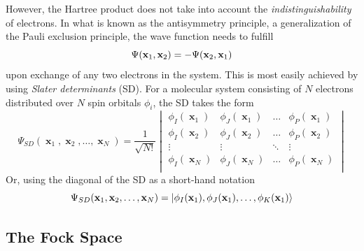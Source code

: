 However, the Hartree product does not take into account the \emph{indistinguishability} of electrons. In what is known as the antisymmetry principle, a generalization of the Pauli exclusion principle, the wave function needs to fulfill 
\begin{equation}
\Psi(\mathbf{x}_1,\mathbf{x}_2) = - \Psi(\mathbf{x}_2,\mathbf{x}_1) 
\end{equation}
\noindent upon exchange of any two electrons in the system. This is most easily achieved by using \emph{Slater determinants} (SD). For a molecular system consisting of $N$ electrons distributed over $N$ spin orbitals $\phi_i$, the SD takes the form
\begin{equation}
\Psi_{SD}(\mbfx_1, \mbfx_2, \ldots, \mbfx_N) = \frac{1}{\sqrt{N!}}
\begin{vmatrix}
\phi_I(\mbfx_1) & \phi_J(\mbfx_1) & \ldots & \phi_P(\mbfx_1) \\
\phi_I(\mbfx_2) & \phi_J(\mbfx_2) & \ldots & \phi_P(\mbfx_2) \\
\vdots & \vdots & \ddots & \vdots \\
\phi_I(\mbfx_N) & \phi_J(\mbfx_N) & \ldots & \phi_P(\mbfx_N) \\
\end{vmatrix}
\end{equation}
\noindent Or, using the diagonal of the SD as a short-hand notation
\begin{equation}
\Psi_{SD}(\mathbf{x}_1, \mathbf{x}_2, \ldots, \mathbf{x}_N) = \ket{\phi_I(\mathbf{x}_1) , \phi_J(\mathbf{x}_1), \ldots, \phi_K(\mathbf{x}_1)}
\end{equation}

\subsection{The Fock Space}

